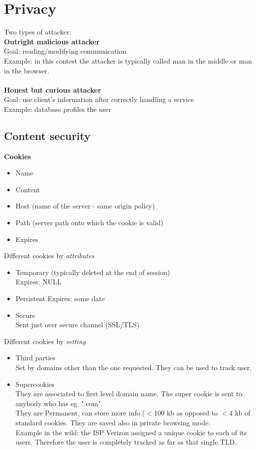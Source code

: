 \documentclass[10pt,a4paper]{book}
\begin{document}
\chapter{Privacy}
Two types of attacker:\\
\textbf{Outright malicious attacker}\\
Goal: reading/modifying communication\\
Example: in this contest the attacker is typically called man in the middle or man in the browser.\\\\
\textbf{Honest but curious attacker}\\
Goal: use client's information after correctly handling a service\\
Example: database profiles the user\\
\section{Content security}
\textbf{Cookies}
\begin{itemize}
\item Name 
\item Content
\item Host (name of the server - same origin policy)
\item Path (server path onto which the cookie is valid)
\item Expires
\end{itemize}
Different cookies by \emph{attributes}
\begin{itemize}
\item Temporary (typically deleted at the end of session)\\
Expires: NULL
\item Persistent
Expires: some date
\item Secure\\
Sent just over secure channel (SSL/TLS)
\end{itemize}
Different cookies by \emph{setting}
\begin{itemize}
\item Third parties\\
Set by domains other than the one requested. They can be used to track user.
\item Supercookies\\
They are associated to first level domain name. The super cookie is sent to anybody who has eg. ".com".\\
They are Permanent, can store more info ($<100$ kb as opposed to $<4$ kb of standard cookies. They are saved also in private browsing mode.\\
Example in the wild: the ISP Verizon assigned a unique cookie to each of its users. Therefore the user is completely tracked as far as that single TLD.
\end{itemize}
\end{document}
